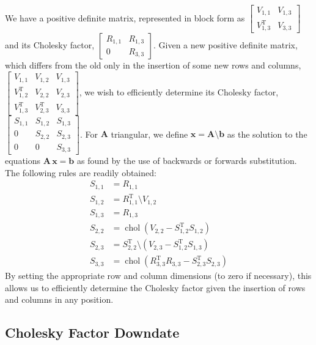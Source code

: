 \documentclass{acmtrans2m}
\newcommand{\vect}[1]{\boldsymbol{#1}}
\newcommand{\vx}{\vect{x}}
\newcommand{\mat}[1]{\mathbf{#1}}
\newcommand{\tr}{\mathrm{T}}
\DeclareMathOperator{\chol}{chol}
\begin{document}
\noindent We have a positive definite matrix, represented in block form as $\begin{bmatrix} V_{1,1} & V_{1,3} \\ V^\tr_{1,3} & V_{3,3} \end{bmatrix}$ and its Cholesky factor, $\begin{bmatrix} R_{1,1} & R_{1,3} \\ 0 & R_{3,3} \end{bmatrix}$. Given a new positive definite matrix, which differs from the old only in the insertion of some new rows and columns,$\begin{bmatrix} V_{1,1} & V_{1,2} & V_{1,3} \\ V^\tr_{1,2} & V_{2,2} & V_{2,3} \\ V^\tr_{1,3} & V^\tr_{2,3} & V_{3,3} \end{bmatrix}
$, we wish to efficiently determine its Cholesky factor, $\begin{bmatrix} S_{1,1} & S_{1,2} & S_{1,3} \\ 0 & S_{2,2} & S_{2,3} \\ 0 & 0 & S_{3,3} \end{bmatrix}
$. For $\mat{A}$ triangular, we define $\vx=\mat{A}\setminus \vect{b}$ as the solution to the equations $\mat{A}\,\vx=\vect{b}$ as found by the use of backwards or forwards substitution. The following rules are readily obtained:
\begin{align}
 S_{1,1}&=R_{1,1}\\
S_{1,2} &=R^\tr_{1,1}\setminus V_{1,2}\\
S_{1,3} &=R_{1,3}\\
S_{2,2} &=\chol (V_{2,2}-S^\tr_{1,2}S_{1,2})\\
S_{2,3} &=S^\tr_{2,2}\setminus (V_{2,3}-S^\tr_{1,2}S_{1,3})\\
S_{3,3} &=\chol (R^\tr_{3,3}R_{3,3}-S^\tr_{2,3}S_{2,3})
\end{align}
By setting the appropriate row and column dimensions (to zero if necessary), this allows us to efficiently determine the Cholesky factor given the insertion of rows and columns in any position. 

\subsection{Cholesky Factor Downdate}
\end{document}
